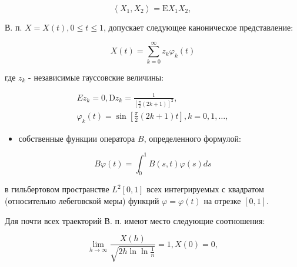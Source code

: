 \documentclass[10pt]{article}
\begin{document}
\[

\left\langle X_{1}, X_{2}\right\rangle=\mathrm{E} X_{1} X_{2} \text {, }

\]



В. п. $X=X(t), 0 \leqslant t \leqslant 1$, допускает следующее каноническое представление:



\[

X(t)=\sum_{k=0}^{\infty} z_{k} \varphi_{k}(t)

\]



где $z_{k}$ - независимые гауссовские величины:



\[

\begin{gathered}

E z_{k}=0, \mathrm{D} z_{k}=\frac{1}{\left[\frac{\pi}{2}(2 k+1)\right]^{2}}, \\

\varphi_{k}(t)=\sin \left[\frac{\pi}{2}(2 k+1) t\right], k=0,1, \ldots,

\end{gathered}

\]



\begin{itemize}

  \item собственные функции оператора $B$, определенного формулой:

\end{itemize}



\[

B \varphi(t)=\int_{0}^{1} B(s, t) \varphi(s) d s

\]



в гильбертовом пространстве $L^{2}[0,1]$ всех интегрируемых с квадратом (относительно лебеговской меры) функций $\varphi=\varphi(t)$ на отрезке $[0,1]$.



Для почти всех траекторий В. п. имеют место следующие соотношения:



\[

\lim _{h \rightarrow \infty} \frac{X(h)}{\sqrt{2 h \ln \ln \frac{1}{n}}}=1, X(0)=0,

\]
\end{document}
